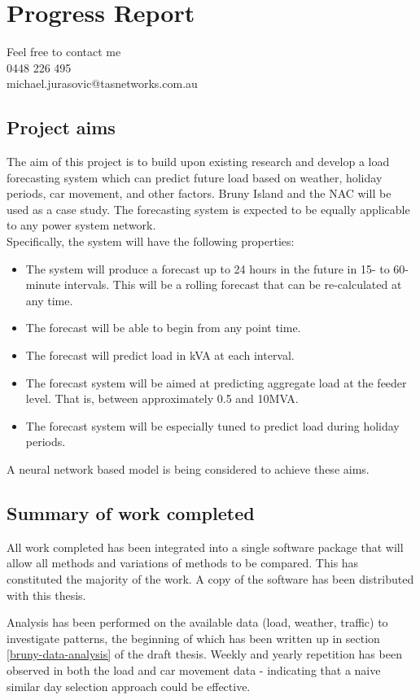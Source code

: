 \chapter*{Progress Report}
Feel free to contact me \\
0448 226 495 \\
michael.jurasovic@tasnetworks.com.au

\section*{Project aims}
The aim of this project is to build upon existing research and develop a load forecasting system which can predict future load based on weather, holiday periods, car movement, and other factors. 
Bruny Island and the NAC will be used as a case study. 
The forecasting system is expected to be equally applicable to any power system network.
\\
Specifically, the system will have the following properties:
\begin{itemize}
	\item The system will produce a forecast up to 24 hours in the future in 15- to 60-minute intervals. This will be a rolling forecast that can be re-calculated at any time.
	\item The forecast will be able to begin from any point time.
	\item The forecast will predict load in kVA at each interval.
	\item The forecast system will be aimed at predicting aggregate load at the feeder level. That is, between approximately 0.5 and 10MVA.
	\item The forecast system will be especially tuned to predict load during holiday periods.
\end{itemize}
\par
A neural network based model is being considered to achieve these aims.


\section*{Summary of work completed}
All work completed has been integrated into a single software package that will allow all methods and variations of methods to be compared. This has constituted the majority of the work.
A copy of the software has been distributed with this thesis.

Analysis has been performed on the available data (load, weather, traffic) to investigate patterns, the beginning of which has been written up in section \ref{bruny-data-analysis} of the draft thesis.
Weekly and yearly repetition has been observed in both the load and car movement data - indicating that a naive similar day selection approach could be effective.

